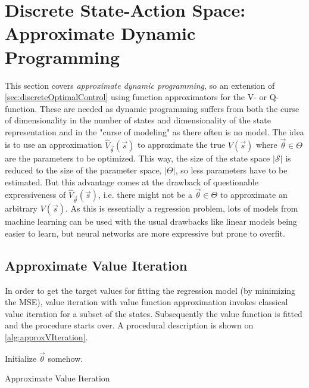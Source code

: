 	\section{Discrete State-Action Space: Approximate Dynamic Programming}
		This section covers \emph{approximate dynamic programming}, so an extension of \autoref{sec:discreteOptimalControl} using function approximators for the V- or Q-function. These are needed as dynamic programming suffers from both the curse of dimensionality in the number of states and dimensionality of the state representation and in the "curse of modeling" as there often is no model. The idea is to use an approximation \( \hat{V}_{\vec{\theta}}(\vec{s}) \) to approximate the true \( V(\vec{s}) \) where \( \vec{\theta} \in \Theta \) are the parameters to be optimized. This way, the size of the state space \( \lvert \mathcal{S} \rvert \) is reduced to the size of the parameter space, \( \lvert \Theta \rvert \), so less parameters have to be estimated. But this advantage comes at the drawback of questionable expressiveness of \( \hat{V}_{\vec{\theta}}(\vec{s}) \), i.e. there might not be a \( \vec{\theta} \in \Theta \) to approximate an arbitrary \( V(\vec{s}) \). As this is essentially a regression problem, lots of models from machine learning can be used with the usual drawbacks like linear models being easier to learn, but neural networks are more expressive but prone to overfit.

		\subsection{Approximate Value Iteration}
			In order to get the target values for fitting the regression model (by minimizing the MSE), value iteration with value function approximation invokes classical value iteration for a subset of the states. Subsequently the value function is fitted and the procedure starts over. A procedural description is shown on \autoref{alg:approxVIteration}.

			\begin{algorithm}  \DontPrintSemicolon
				Initialize \( \vec{\theta} \) somehow. \;

				\caption{Approximate Value Iteration}
				\label{alg:approxVIteration}
			\end{algorithm}

